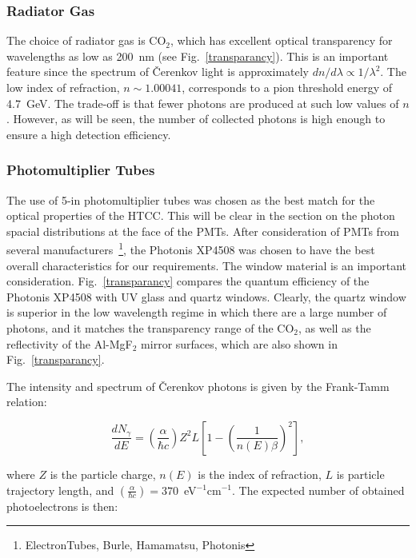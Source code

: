 \subsubsection{Radiator Gas} 

The choice of radiator gas is CO$_2$, which has excellent optical 
transparency for wavelengths as low as 200~nm (see Fig.~\ref{transparancy}).
This is an important feature since the spectrum of {\v C}erenkov light is 
approximately $dn/d\lambda\propto 1/\lambda^2$.  The low index of 
refraction, $n \sim 1.00041$, corresponds to a pion threshold energy of 
4.7~GeV.  The trade-off is that fewer photons are produced at such low 
values of $n$. However, as will be seen, the number of collected photons 
is high enough to ensure a high detection efficiency. 

\subsubsection{Photomultiplier Tubes}

The use of 5-in photomultiplier tubes was chosen as the best match for the 
optical properties of the HTCC. This will be clear in the section on the 
photon spacial distributions at the face of the PMTs.  After consideration 
of PMTs from several manufacturers~\footnote{ElectronTubes, Burle, Hamamatsu, 
Photonis}, the Photonis XP4508 was chosen to have the best overall 
characteristics for our requirements. The window material is an important 
consideration.  Fig.~\ref{transparancy} compares the quantum efficiency of 
the Photonis XP4508 with UV glass and quartz windows. Clearly, the quartz 
window is superior in the low wavelength regime in which there are a large 
number of photons, and it matches the transparency range of the CO$_2$, as 
well as the reflectivity of the Al-MgF$_2$ mirror surfaces, which are also 
shown in Fig.~\ref{transparancy}.

The intensity and spectrum of \v{C}erenkov photons is given by the 
Frank-Tamm relation:

\begin{equation}
\frac{dN_{\gamma}}{dE} = \left( \frac{\alpha}{\hbar c} \right) Z^2 L
\left[1-(\frac{1}{n(E)\beta})^2 \right],
\end{equation} 

\noindent
where $Z$ is the particle charge, $n(E)$ is the index of refraction,
$L$ is particle trajectory length, and $(\frac{\alpha}{\hbar c}) = 
370$~eV$^{-1}$cm$^{-1}$. The expected number of obtained photoelectrons 
is then:
   
